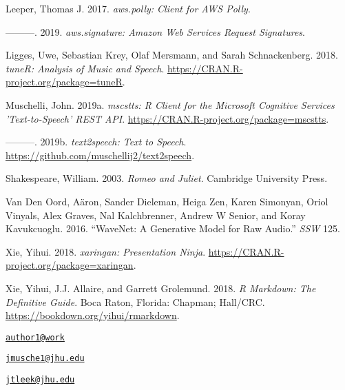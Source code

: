\leavevmode\hypertarget{ref-aws.polly}{}%
Leeper, Thomas J. 2017. \emph{aws.polly: Client for AWS Polly}.

\leavevmode\hypertarget{ref-aws.signature}{}%
---------. 2019. \emph{aws.signature: Amazon Web Services Request
Signatures}.

\leavevmode\hypertarget{ref-tuneR}{}%
Ligges, Uwe, Sebastian Krey, Olaf Mersmann, and Sarah Schnackenberg.
2018. \emph{tuneR: Analysis of Music and Speech}.
\url{https://CRAN.R-project.org/package=tuneR}.

\leavevmode\hypertarget{ref-mscstts}{}%
Muschelli, John. 2019a. \emph{mscstts: R Client for the Microsoft
Cognitive Services 'Text-to-Speech' REST API}.
\url{https://CRAN.R-project.org/package=mscstts}.

\leavevmode\hypertarget{ref-text2speech}{}%
---------. 2019b. \emph{text2speech: Text to Speech}.
\url{https://github.com/muschellij2/text2speech}.

\leavevmode\hypertarget{ref-shakespeare2003romeo}{}%
Shakespeare, William. 2003. \emph{Romeo and Juliet}. Cambridge
University Press.

\leavevmode\hypertarget{ref-van2016wavenet}{}%
Van Den Oord, Aäron, Sander Dieleman, Heiga Zen, Karen Simonyan, Oriol
Vinyals, Alex Graves, Nal Kalchbrenner, Andrew W Senior, and Koray
Kavukcuoglu. 2016. ``WaveNet: A Generative Model for Raw Audio.''
\emph{SSW} 125.

\leavevmode\hypertarget{ref-xaringan}{}%
Xie, Yihui. 2018. \emph{xaringan: Presentation Ninja}.
\url{https://CRAN.R-project.org/package=xaringan}.

\leavevmode\hypertarget{ref-rmarkdownbook}{}%
Xie, Yihui, J.J. Allaire, and Garrett Grolemund. 2018. \emph{R Markdown:
The Definitive Guide}. Boca Raton, Florida: Chapman; Hall/CRC.
\url{https://bookdown.org/yihui/rmarkdown}.



\address{%
Sean Kross\\
Cognitive Science, University of California, San Diego\\
9500 Gilman Dr.\\ La Jolla, CA 92093\\
}
\href{mailto:author1@work}{\nolinkurl{author1@work}}

\address{%
John Muschelli\\
Department of Biostatistics, Johns Hopkins Bloomberg School of Public
Health\\
615 N Wolfe Street\\ Baltimore, MD 21231\\
}
\href{mailto:jmusche1@jhu.edu}{\nolinkurl{jmusche1@jhu.edu}}

\address{%
Jeffrey T. Leek\\
Department of Biostatistics, Johns Hopkins Bloomberg School of Public
Health\\
615 N Wolfe Street\\ Baltimore, MD 21231\\
}
\href{mailto:jtleek@jhu.edu}{\nolinkurl{jtleek@jhu.edu}}

